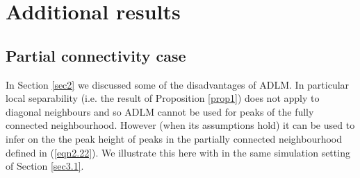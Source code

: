 \documentclass{article}
\begin{document}
\section{Additional results}
\label{appendix.e}
\subsection{Partial connectivity case}
\label{appendix.d1}
In Section \ref{sec2} we discussed some of the disadvantages of ADLM. In particular local separability (i.e. the result of Proposition \ref{prop1}) does not apply to diagonal neighbours and so ADLM cannot be used for peaks of the fully connected neighbourhood. However (when its assumptions hold) it can be used to infer on the the peak height of peaks in the partially connected neighbourhood defined in (\eqref{eqn2.22}). We illustrate this here with in the same simulation setting of Section \ref{sec3.1}.
\end{document}
